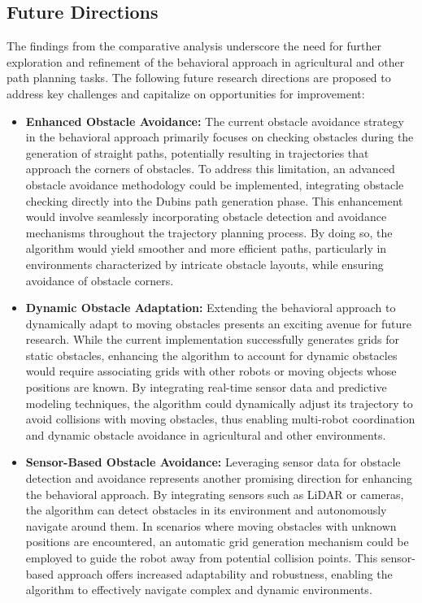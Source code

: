 
\subsection{Future Directions}


The findings from the comparative analysis underscore the need for further exploration and refinement of the behavioral approach in agricultural and other path planning tasks. The following future research directions are proposed to address key challenges and capitalize on opportunities for improvement:

\vspace*{6mm}

\begin{itemize}
    \item \textbf{Enhanced Obstacle Avoidance: } The current obstacle avoidance strategy in the behavioral approach primarily focuses on checking obstacles during the generation of straight paths, potentially resulting in trajectories that approach the corners of obstacles. To address this limitation, an advanced obstacle avoidance methodology could be implemented, integrating obstacle checking directly into the Dubins path generation phase. This enhancement would involve seamlessly incorporating obstacle detection and avoidance mechanisms throughout the trajectory planning process. By doing so, the algorithm would yield smoother and more efficient paths, particularly in environments characterized by intricate obstacle layouts, while ensuring avoidance of obstacle corners.
    
    \item \textbf{Dynamic Obstacle Adaptation: } Extending the behavioral approach to dynamically adapt to moving obstacles presents an exciting avenue for future research. While the current implementation successfully generates grids for static obstacles, enhancing the algorithm to account for dynamic obstacles would require associating grids with other robots or moving objects whose positions are known. By integrating real-time sensor data and predictive modeling techniques, the algorithm could dynamically adjust its trajectory to avoid collisions with moving obstacles, thus enabling multi-robot coordination and dynamic obstacle avoidance in agricultural and other environments.
    
    \item \textbf{Sensor-Based Obstacle Avoidance: } Leveraging sensor data for obstacle detection and avoidance represents another promising direction for enhancing the behavioral approach. By integrating sensors such as LiDAR or cameras, the algorithm can detect obstacles in its environment and autonomously navigate around them. In scenarios where moving obstacles with unknown positions are encountered, an automatic grid generation mechanism could be employed to guide the robot away from potential collision points. This sensor-based approach offers increased adaptability and robustness, enabling the algorithm to effectively navigate complex and dynamic environments.
    

\end{itemize}
